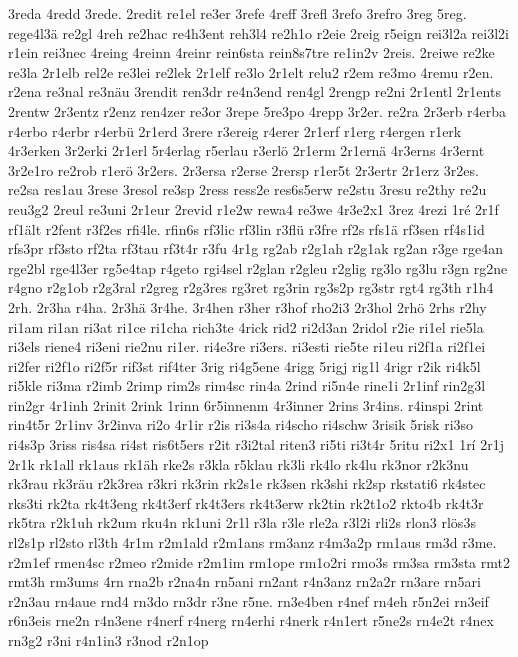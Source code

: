 {3reda
4redd
3rede.
2redit
re1el
re3er
3refe
4reff
3refl
3refo
3refro
3reg
5reg.
rege4l3ä
re2gl
4reh
re2hac
re4h3ent
reh3l4
re2h1o
r2eie
2reig
r5eign
rei3l2a
rei3l2i
r1ein
rei3nec
4reing
4reinn
4reinr
rein6sta
rein8s7tre
re1in2v
2reis.
2reiwe
re2ke
re3la
2r1elb
rel2e
re3lei
re2lek
2r1elf
re3lo
2r1elt
relu2
r2em
re3mo
4remu
r2en.
r2ena
re3nal
re3näu
3rendit
ren3dr
re4n3end
ren4gl
2rengp
re2ni
2r1entl
2r1ents
2rentw
2r3entz
r2enz
ren4zer
re3or
3repe
5re3po
4repp
3r2er.
re2ra
2r3erb
r4erba
r4erbo
r4erbr
r4erbü
2r1erd
3rere
r3ereig
r4erer
2r1erf
r1erg
r4ergen
r1erk
4r3erken
3r2erki
2r1erl
5r4erlag
r5erlau
r3erlö
2r1erm
2r1ernä
4r3erns
4r3ernt
3r2e1ro
re2rob
r1erö
3r2ers.
2r3ersa
r2erse
2rersp
r1er5t
2r3ertr
2r1erz
3r2es.
re2sa
res1au
3rese
3resol
re3sp
2ress
ress2e
res6s5erw
re2stu
3resu
re2thy
re2u
reu3g2
2reul
re3uni
2r1eur
2revid
r1e2w
rewa4
re3we
4r3e2x1
3rez
4rezi
1ré
2r1f
rf1ält
r2fent
r3f2es
rfi4le.
rfin6s
rf3lic
rf3lin
r3flü
r3fre
rf2s
rfs1ä
rf3sen
rf4s1id
rfs3pr
rf3sto
rf2ta
rf3tau
rf3t4r
r3fu
4r1g
rg2ab
r2g1ah
r2g1ak
rg2an
r3ge
rge4an
rge2bl
rge4l3er
rg5e4tap
r4geto
rgi4sel
r2glan
r2gleu
r2glig
rg3lo
rg3lu
r3gn
rg2ne
r4gno
r2g1ob
r2g3ral
r2greg
r2g3res
rg3ret
rg3rin
rg3s2p
rg3str
rgt4
rg3th
r1h4
2rh.
2r3ha
r4ha.
2r3hä
3r4he.
3r4hen
r3her
r3hof
rho2i3
2r3hol
2rhö
2rhs
r2hy
ri1am
ri1an
ri3at
ri1ce
ri1cha
rich3te
4rick
rid2
ri2d3an
2ridol
r2ie
ri1el
rie5la
ri3els
riene4
ri3eni
rie2nu
ri1er.
ri4e3re
ri3ers.
ri3esti
rie5te
ri1eu
ri2f1a
ri2f1ei
ri2fer
ri2f1o
ri2f5r
rif3st
rif4ter
3rig
ri4g5ene
4rigg
5rigj
rig1l
4rigr
r2ik
ri4k5l
ri5kle
ri3ma
r2imb
2rimp
rim2s
rim4sc
rin4a
2rind
ri5n4e
rine1i
2r1inf
rin2g3l
rin2gr
4r1inh
2rinit
2rink
1rinn
6r5innenm
4r3inner
2rins
3r4ins.
r4inspi
2rint
rin4t5r
2r1inv
3r2inva
ri2o
4r1ir
r2is
ri3s4a
ri4scho
ri4schw
3risik
5risk
ri3so
ri4s3p
3riss
ris4sa
ri4st
ris6t5ers
r2it
r3i2tal
riten3
ri5ti
ri3t4r
5ritu
ri2x1
1rí
2r1j
2r1k
rk1all
rk1aus
rk1äh
rke2s
r3kla
r5klau
rk3li
rk4lo
rk4lu
rk3nor
r2k3nu
rk3rau
rk3räu
r2k3rea
r3kri
rk3rin
rk2s1e
rk3sen
rk3shi
rk2sp
rkstati6
rk4stec
rks3ti
rk2ta
rk4t3eng
rk4t3erf
rk4t3ers
rk4t3erw
rk2tin
rk2t1o2
rkto4b
rk4t3r
rk5tra
r2k1uh
rk2um
rku4n
rk1uni
2r1l
r3la
r3le
rle2a
r3l2i
rli2s
rlon3
rlös3s
rl2s1p
rl2sto
rl3th
4r1m
r2m1ald
r2m1ans
rm3anz
r4m3a2p
rm1aus
rm3d
r3me.
r2m1ef
rmen4sc
r2meo
r2mide
r2m1im
rm1ope
rm1o2ri
rmo3s
rm3sa
rm3sta
rmt2
rmt3h
rm3ums
4rn
rna2b
r2na4n
rn5ani
rn2ant
r4n3anz
rn2a2r
rn3are
rn5ari
r2n3au
rn4aue
rnd4
rn3do
rn3dr
r3ne
r5ne.
rn3e4ben
r4nef
rn4eh
r5n2ei
rn3eif
r6n3eis
rne2n
r4n3ene
r4nerf
r4nerg
rn4erhi
r4nerk
r4n1ert
r5ne2s
rn4e2t
r4nex
rn3g2
r3ni
r4n1in3
r3nod
r2n1op
}
